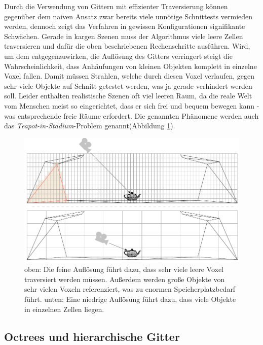Durch die Verwendung von Gittern mit effizienter Traversierung können gegenüber dem naiven Ansatz zwar bereits viele unnötige Schnittests vermieden werden, dennoch zeigt das Verfahren in gewissen Konfigurationen signifikante Schwächen. Gerade in kargen Szenen muss der Algorithmus viele leere Zellen traversieren und dafür die oben beschriebenen Rechenschritte ausführen. Wird, um dem entgegenzuwirken, die Auflösung des Gitters verringert steigt die Wahrscheinlichkeit, dass Anhäufungen von kleinen Objekten komplett in einzelne Voxel fallen. Damit müssen Strahlen, welche durch diesen Voxel verlaufen, gegen sehr viele Objekte auf Schnitt getestet werden, was ja gerade verhindert werden soll.
Leider enthalten realistische Szenen oft viel leeren Raum, da die reale Welt vom Menschen meist so eingerichtet, dass er sich frei und bequem bewegen kann - was entsprechende freie Räume erfordert.
Die genannten Phänomene werden auch das \textit{Teapot-in-Stadium}-Problem genannt(Abbildung \ref{fig:stadium}).

\begin{figure}
\includegraphics[width=1.0\textwidth]{images/stadium.pdf}
\caption[Teapot-in-Stadium bei regelmäßigen Gittern]{oben: Die feine Auflösung führt dazu, dass sehr viele leere Voxel traversiert werden müssen. Außerdem werden große Objekte von sehr vielen Voxeln referenziert, was zu enormen Speicherplatzbedarf führt. unten: Eine niedrige Auflösung führt dazu, dass viele Objekte in einzelnen Zellen liegen.}
\label{fig:stadium}
\end{figure}

\subsection{Octrees und hierarchische Gitter}

